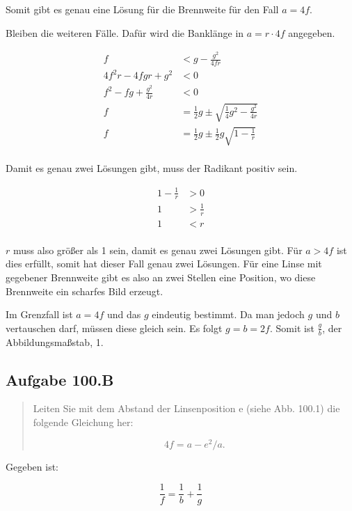 \documentclass[11pt]{article}
\newcommand{\half}{\frac{1}{2}}
\begin{document}
Somit gibt es genau eine Lösung für die Brennweite für den Fall $a = 4f$.

Bleiben die weiteren Fälle. Dafür wird die Banklänge in $a = r \cdot 4f$ angegeben.


\begin{align*}
f &< g - \frac{g^2}{4fr} \\
4f^2r - 4fgr + g^2 &< 0 \\
f^2 - fg + \frac{g^2}{4r} &< 0 \\
f &= \half g \pm \sqrt{\frac{1}{4} g^2 - \frac{g^2}{4r}} \\
f &= \half g \pm \half g \sqrt{1 - \frac{1}{r}} \\
\end{align*}

Damit es genau zwei Lösungen gibt, muss der Radikant positiv sein.

\begin{align*}
1 - \frac{1}{r} &> 0 \\
1 &> \frac{1}{r} \\
1 &< r \\
\end{align*}

$r$ muss also größer als 1 sein, damit es genau zwei Lösungen gibt. Für $a > 4f$ ist dies erfüllt, somit hat dieser Fall genau zwei Lösungen. Für eine Linse mit gegebener Brennweite gibt es also an zwei Stellen eine Position, wo diese Brennweite ein scharfes Bild erzeugt.


Im Grenzfall ist $a = 4f$ und das $g$ eindeutig bestimmt. Da man jedoch $g$ und $b$ vertauschen darf, müssen diese gleich sein. Es folgt $g = b = 2f$. Somit ist $\frac{g}{b}$, der Abbildungsmaßstab, 1.


\subsection{Aufgabe 100.B}

\begin{quote}
Leiten Sie mit dem Abstand der Linsenposition e (siehe Abb. 100.1) die folgende Gleichung her:

\begin{equation}
4f = a - e^2/a.
\end{equation}
\end{quote}

Gegeben ist:

\begin{equation}
\label{fbg}
\frac{1}{f} = \frac{1}{b} + \frac{1}{g}
\end{equation}
\end{document}
